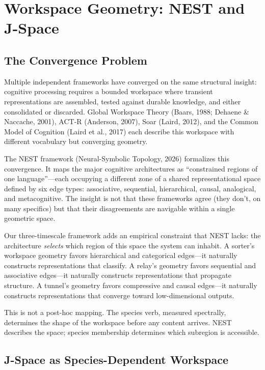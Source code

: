 \documentclass[12pt]{article}
\begin{document}
\section{Workspace Geometry: NEST and J-Space}

\subsection{The Convergence Problem}

Multiple independent frameworks have converged on the same structural insight: cognitive processing requires a bounded workspace where transient representations are assembled, tested against durable knowledge, and either consolidated or discarded. Global Workspace Theory (Baars, 1988; Dehaene \& Naccache, 2001), ACT-R (Anderson, 2007), Soar (Laird, 2012), and the Common Model of Cognition (Laird et al., 2017) each describe this workspace with different vocabulary but converging geometry.

The NEST framework (Neural-Symbolic Topology, 2026) formalizes this convergence. It maps the major cognitive architectures as ``constrained regions of one language''---each occupying a different zone of a shared representational space defined by six edge types: associative, sequential, hierarchical, causal, analogical, and metacognitive. The insight is not that these frameworks agree (they don't, on many specifics) but that their disagreements are navigable within a single geometric space.

Our three-timescale framework adds an empirical constraint that NEST lacks: the architecture \emph{selects} which region of this space the system can inhabit. A sorter's workspace geometry favors hierarchical and categorical edges---it naturally constructs representations that classify. A relay's geometry favors sequential and associative edges---it naturally constructs representations that propagate structure. A tunnel's geometry favors compressive and causal edges---it naturally constructs representations that converge toward low-dimensional outputs.

This is not a post-hoc mapping. The species verb, measured spectrally, determines the shape of the workspace before any content arrives. NEST describes the space; species membership determines which subregion is accessible.

\subsection{J-Space as Species-Dependent Workspace}
\end{document}
